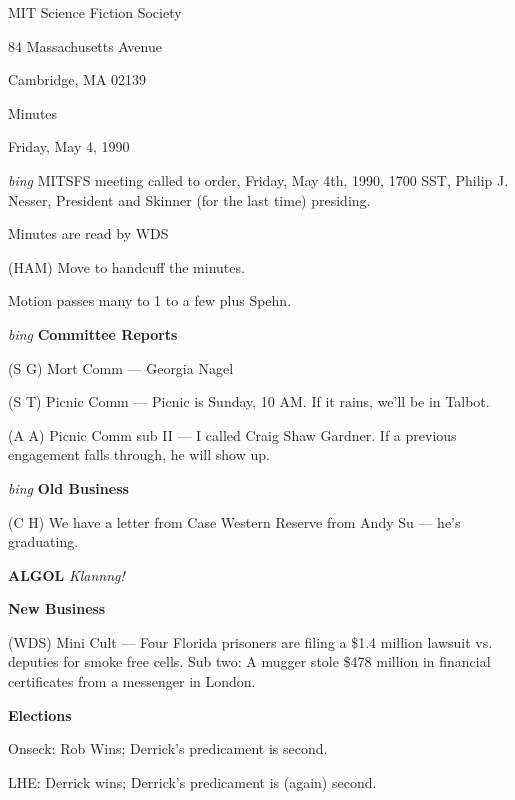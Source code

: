 \setlength{\topmargin}{-0.5in}
\setlength{\oddsidemargin}{0.0in}
\setlength{\evensidemargin}{0.0in}
\setlength{\textheight}{9in}
\setlength{\textwidth}{6.5in}



\begin{center}
MIT Science Fiction Society

84 Massachusetts Avenue

Cambridge, MA 02139

\vspace{0.2in}
Minutes

Friday, May 4, 1990

\end{center}
 
\vspace{0.15in}
{\em bing\/}  MITSFS meeting called to order, Friday, May 4th, 1990,
1700 SST, Philip J. Nesser, President and Skinner (for the last time)
presiding.

Minutes are read by WDS

(HAM) Move to handcuff the minutes.

Motion passes many to 1 to a few plus Spehn.

\vspace{0.15in}
{\em bing\/} {\bf Committee Reports}

(S G) Mort Comm --- Georgia Nagel

(S T) Picnic Comm --- Picnic is Sunday, 10 AM.  If it rains, we'll be in
Talbot.

(A A) Picnic Comm sub II --- I called Craig Shaw Gardner.  If a previous
engagement falls through, he will show up.

\vspace{0.15in}
{\em bing\/} {\bf Old Business}

(C H) We have a letter from Case Western Reserve from Andy Su --- he's
graduating.

{\bf ALGOL}  {\em Klannng!\/}

\vspace{0.15in}
{\bf New Business}

(WDS) Mini Cult --- Four Florida prisoners are filing a \$1.4 million lawsuit
vs. deputies for smoke free cells.
Sub two: A mugger stole \$478 million in financial certificates from a
messenger in London.

{\bf Elections}

Onseck: Rob Wins; Derrick's predicament is second.

LHE: Derrick wins; Derrick's predicament is (again) second.

